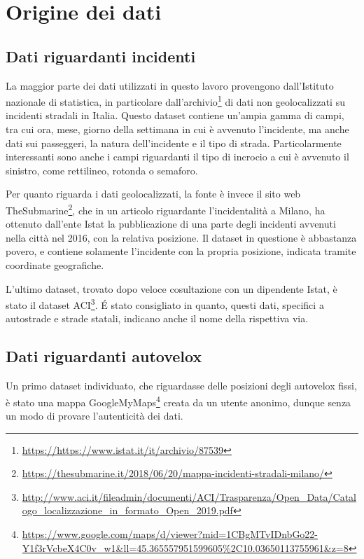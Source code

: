 \documentclass[a4paper]{report}
\begin{document}
\section{Origine dei dati}

\subsection{Dati riguardanti incidenti}
La maggior parte dei dati utilizzati in questo lavoro provengono 
dall'Istituto nazionale di statistica, 
in particolare dall'archivio\footnote{\url{https://https://www.istat.it/it/archivio/87539}} 
di dati non geolocalizzati su incidenti stradali in Italia.
Questo dataset contiene un'ampia gamma di campi, tra cui ora, 
mese, giorno della settimana in cui è avvenuto l'incidente, 
ma anche dati sui passeggeri, la natura dell'incidente e il tipo di strada. 
Particolarmente interessanti sono anche i campi riguardanti il tipo di incrocio a cui è 
avvenuto il sinistro, come rettilineo, rotonda o semaforo.

Per quanto riguarda i dati geolocalizzati, 
la fonte è invece il sito web TheSubmarine\footnote{\url{https://thesubmarine.it/2018/06/20/mappa-incidenti-stradali-milano/}},
che in un articolo riguardante l'incidentalità a Milano, 
ha ottenuto dall'ente Istat la pubblicazione di una parte degli 
incidenti avvenuti nella città nel 2016, con la relativa posizione.
Il dataset in questione è abbastanza povero, e contiene solamente l'incidente con la 
propria posizione, indicata tramite coordinate geografiche.

L'ultimo dataset, trovato dopo veloce cosultazione con un dipendente Istat, è stato 
il dataset ACI\footnote{\url{http://www.aci.it/fileadmin/documenti/ACI/Trasparenza/Open_Data/Catalogo_localizzazione_in_formato_Open_2019.pdf}}.
\'E stato consigliato in quanto, questi dati, specifici a autostrade e strade statali, 
indicano anche il nome della rispettiva via.

\subsection{Dati riguardanti autovelox}
Un primo dataset individuato, che riguardasse delle posizioni degli autovelox fissi, 
è stato una mappa GoogleMyMaps\footnote{\url{https://www.google.com/maps/d/viewer?mid=1CBgMTvIDnbGo22-Y1f3rVcbeX4C0v_w1&ll=45.365557951599605%2C10.03650113755961&z=8}} 
creata da un utente anonimo, dunque senza un modo di provare l'autenticità dei dati.
\end{document}
